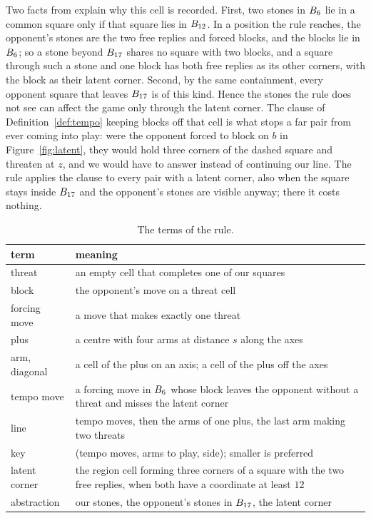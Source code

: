 \documentclass[11pt]{amsart}
\theoremstyle{definition}
\theoremstyle{remark}
\begin{document}
Two facts from \cite[Section~6]{reid-threshold} explain why this cell
is recorded. First, two stones in $B_6$ lie in a common
square only if that square lies in $B_{12}$. In a position the
rule reaches, the opponent's stones are the two free replies and
forced blocks, and the blocks lie in $B_6$; so a stone beyond
$B_{17}$ shares no square with two blocks, and a square through
such a stone and one block has both free replies as its other
corners, with the block as their latent corner. Second, by the same
containment, every opponent square that leaves $B_{17}$ is of
this kind. Hence the stones the rule does not see can affect the game
only through the latent corner. The clause of
Definition~\ref{def:tempo} keeping blocks off that cell is what stops
a far pair from ever coming into play: were the opponent forced to
block on $b$ in Figure~\ref{fig:latent}, they would hold three corners
of the dashed square and threaten at $z$, and we would have to answer
instead of continuing our line. The rule applies the clause to every
pair with a latent corner, also when the square stays inside
$B_{17}$ and the opponent's stones are visible anyway; there it
costs nothing.

\begin{table}[ht]
\centering
\begin{tabular}{lp{}}
\toprule
term & meaning \\
\midrule
threat & an empty cell that completes one of our squares \\
block & the opponent's move on a threat cell \\
forcing move & a move that makes exactly one threat \\
plus & a centre with four arms at distance $s$ along the axes \\
arm, diagonal & a cell of the plus on an axis; a cell of the plus off the axes \\
tempo move & a forcing move in $B_6$ whose block leaves the opponent without a threat and misses the latent corner \\
line & tempo moves, then the arms of one plus, the last arm making two threats \\
key & (tempo moves, arms to play, side); smaller is preferred \\
latent corner & the region cell forming three corners of a square with the two free replies, when both have a coordinate at least $12$ \\
abstraction & our stones, the opponent's stones in $B_{17}$, the latent corner \\
\bottomrule
\end{tabular}
\medskip
\caption{The terms of the rule.}
\label{tab:terms}
\end{table}
\end{document}
